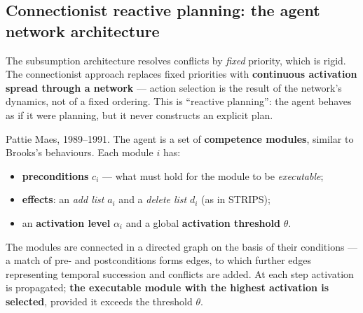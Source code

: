 \documentclass[11pt,a4paper]{article}
\theoremstyle{definition}
\providecommand{\uv}[1]{``#1''}
\begin{document}
\subsection{Connectionist reactive planning: the agent network architecture}
\label{ssec:maes}

The subsumption architecture resolves conflicts by \emph{fixed} priority, which is rigid. The
connectionist approach replaces fixed priorities with \textbf{continuous activation spread through a
network} --- action selection is the result of the network's dynamics, not of a fixed ordering. This
is \uv{reactive planning}: the agent behaves as if it were planning, but it never constructs an
explicit plan.

\begin{defbox}
Pattie Maes, 1989--1991. The agent is a set of \textbf{competence modules}, similar to Brooks's
behaviours. Each module $i$ has:
\begin{itemize}
\item \textbf{preconditions} $c_i$ --- what must hold for the module to be \emph{executable};
\item \textbf{effects}: an \emph{add list} $a_i$ and a \emph{delete list} $d_i$ (as in STRIPS);
\item an \textbf{activation level} $\alpha_i$ and a global \textbf{activation threshold} $\theta$.
\end{itemize}
The modules are connected in a directed graph on the basis of their conditions --- a match of pre-
and postconditions forms edges, to which further edges representing temporal succession and
conflicts are added. At each step activation is propagated; \textbf{the executable module with the
highest activation is selected}, provided it exceeds the threshold $\theta$.
\end{defbox}
\end{document}
